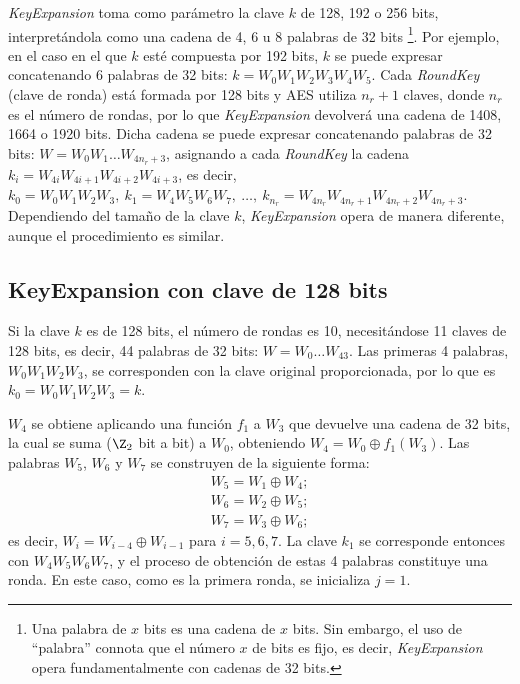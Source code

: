 \textit{KeyExpansion} toma como parámetro la clave $k$ de 128, 192 o 256 bits, interpretándola como una cadena de 4, 6 u 8 palabras de 32 bits \footnote{
Una palabra de $x$ bits es una cadena de $x$ bits. Sin embargo, el uso de ``palabra'' connota que el número $x$ de bits es fijo, es decir, \textit{KeyExpansion} opera fundamentalmente con cadenas de 32 bits.
}.
Por ejemplo, en el caso en el que $k$ esté compuesta por 192 bits, $k$ se puede expresar concatenando 6 palabras de 32 bits: $k = W_0W_1W_2W_3W_4W_5$. Cada \textit{RoundKey} (clave de ronda) está formada por 128 bits y AES utiliza $n_r + 1$ claves, donde $n_r$ es el número de rondas, por lo que \textit{KeyExpansion} devolverá una cadena de 1408, 1664 o 1920 bits. Dicha cadena se puede expresar concatenando palabras de 32 bits: $W = W_0W_1\ldots W_{4n_r+3}$, asignando a cada \textit{RoundKey} la cadena $k_i = W_{4i}W_{4i+1}W_{4i+2}W_{4i+3}$, es decir, $k_0 = W_0W_1W_2W_3,\ k_1 = W_4W_5W_6W_7,\ \ldots  ,\ k_{n_r} = W_{4n_r}W_{4n_r+1}W_{4n_r+2}W_{4n_r+3}$. Dependiendo del tamaño de la clave $k$, \textit{KeyExpansion} opera de manera diferente, aunque el procedimiento es similar. 

\vspace{-0.5em}
\subsection{KeyExpansion con clave de 128 bits}
Si la clave $k$ es de 128 bits, el número de rondas es 10, necesitándose 11 claves de 128 bits, es decir, 44 palabras de 32 bits: $W = W_0\ldots W_{43}$. Las primeras 4 palabras, $W_0W_1W_2W_3$, se corresponden con la clave original proporcionada, por lo que es $k_0 = W_0W_1W_2W_3 = k$. 

$W_4$ se obtiene aplicando una función $f_1$ a $W_3$ que devuelve una cadena de 32 bits, la cual se suma ($\Z_2$ bit a bit) a $W_0$, obteniendo $W_4 = W_0\oplus f_1(W_3) $. Las palabras $W_5$, $W_6$ y $W_7$ se construyen de la siguiente forma:
\vspace{-1em}
\begin{align*}
    W_5 = W_1  \oplus W_4;\\ W_6 = W_2  \oplus W_5;\\W_7 = W_3  \oplus W_6;
\end{align*}
es decir, $W_i = W_{i-4} \oplus W_{i-1}$ para $i = 5,6,7$. La clave $k_1$ se corresponde entonces con $W_4W_5W_6W_7$, y el proceso de obtención de estas 4 palabras constituye una ronda. En este caso, como es la primera ronda, se inicializa $j = 1$.

